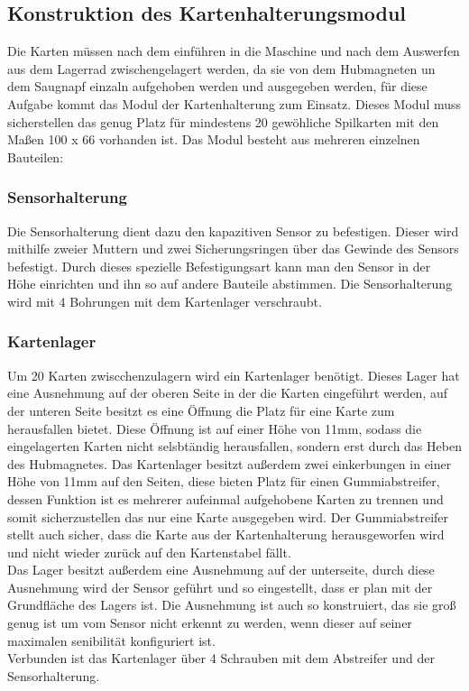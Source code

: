 \subsection{Konstruktion des Kartenhalterungsmodul}
Die Karten müssen nach dem einführen in die Maschine und nach dem Auswerfen aus dem Lagerrad zwischengelagert werden, da sie
von dem Hubmagneten un dem Saugnapf einzaln aufgehoben werden und ausgegeben werden, für diese Aufgabe kommt das Modul der
Kartenhalterung zum Einsatz. Dieses Modul muss sicherstellen das genug Platz für mindestens 20 gewöhliche Spilkarten mit den Maßen 100 x 66
vorhanden ist. Das Modul besteht aus mehreren einzelnen Bauteilen:

\subsubsection{Sensorhalterung}
Die Sensorhalterung dient dazu den kapazitiven Sensor zu befestigen. Dieser wird mithilfe zweier Muttern und zwei Sicherungsringen
über das Gewinde des Sensors befestigt. Durch dieses spezielle Befestigungsart kann man den Sensor in der Höhe einrichten und ihn so
auf andere Bauteile abstimmen. Die Sensorhalterung wird mit 4 Bohrungen mit dem Kartenlager verschraubt.

\subsubsection{Kartenlager}

Um 20 Karten zwiscchenzulagern wird ein Kartenlager benötigt. Dieses Lager hat eine Ausnehmung auf der oberen Seite in der die Karten
eingeführt werden, auf der unteren Seite besitzt es eine Öffnung die Platz für eine Karte zum herausfallen bietet. Diese Öffnung ist auf
einer Höhe von 11mm, sodass die eingelagerten Karten nicht selsbtändig herausfallen, sondern erst durch das Heben des Hubmagnetes.
Das Kartenlager besitzt außerdem zwei einkerbungen in einer Höhe von 11mm auf den Seiten, diese bieten Platz für einen Gummiabstreifer,
dessen Funktion ist es mehrerer aufeinmal aufgehobene Karten zu trennen und somit sicherzustellen das nur eine Karte ausgegeben wird.
Der Gummiabstreifer stellt auch sicher, dass die Karte aus der Kartenhalterung herausgeworfen wird und nicht wieder zurück auf den Kartenstabel
fällt. \\
Das Lager besitzt außerdem eine Ausnehmung auf der unterseite, durch diese Ausnehmung wird der Sensor geführt und so eingestellt,
dass er plan mit der Grundfläche des Lagers ist. Die Ausnehmung ist auch so konstruiert, das sie groß genug ist um vom Sensor
nicht erkennt zu werden, wenn dieser auf seiner maximalen senibilität konfiguriert ist.\\
Verbunden ist das Kartenlager über 4 Schrauben mit dem Abstreifer und der Sensorhalterung.

